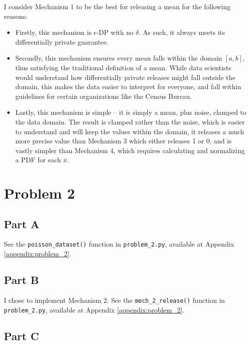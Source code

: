 \documentclass[12pt]{article}
\def\cl{\lstinline}
\begin{document}
\noindent

I consider Mechanism 1 to be the best for releasing a mean for the following reasons:

\begin{itemize}
    \item Firstly, this mechanism is $\epsilon$-DP with no $\delta$. As such, it always meets its differentially private guarantee.
    \item Secondly, this mechanism ensures every mean falls within the domain $[a, b]$, thus satisfying the traditional definition of a mean. While data scientists would understand how differentially private releases might fall outside the domain, this makes the data easier to interpret for everyone, and fall within guidelines for certain organizations like the Census Bureau.
    \item Lastly, this mechanism is simple -- it is simply a mean, plus noise, clamped to the data domain. The result is clamped rather than the noise, which is easier to understand and will keep the values within the domain, it releases a much more precise value than Mechanism 3 which either releases 1 or 0, and is vastly simpler than Mechanism 4, which requires calculating and normalizing a PDF for each $\bar{x}$.
\end{itemize}

\newpage

\section{Problem 2}

\subsection{Part A}

\noindent

See the \cl{poisson_dataset()} function in \cl{problem_2.py}, available at Appendix \ref{appendix:problem_2}.

\subsection{Part B}

\noindent

I chose to implement Mechanism 2. See the \cl{mech_2_release()} function in \cl{problem_2.py}, available at Appendix \ref{appendix:problem_2}.

\subsection{Part C}
\end{document}
